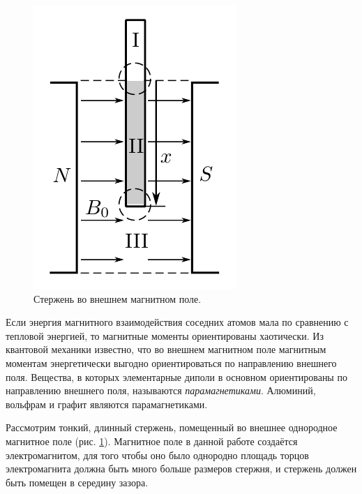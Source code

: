 \begin{figure}
	\includegraphics[width=\linewidth]{../res/rod.png}
	\caption{Стержень во внешнем магнитном поле.}
	\label{img:rod}
\end{figure}

Если энергия магнитного взаимодействия соседних атомов мала по сравнению с тепловой энергией, то магнитные моменты ориентированы хаотически. Из квантовой механики известно, что во внешнем магнитном поле магнитным моментам энергетически выгодно ориентироваться по направлению внешнего поля. Вещества, в которых элементарные диполи в основном ориентированы по направлению внешнего поля, называются \textit{парамагнетиками}. Алюминий, вольфрам и графит являются парамагнетиками.

Рассмотрим тонкий, длинный стержень, помещенный во внешнее однородное магнитное поле (рис. \ref{img:rod}). Магнитное поле в данной работе создаётся электромагнитом, для того чтобы оно было однородно площадь торцов электромагнита должна быть много больше размеров стержня, и стержень должен быть помещен в середину зазора.

